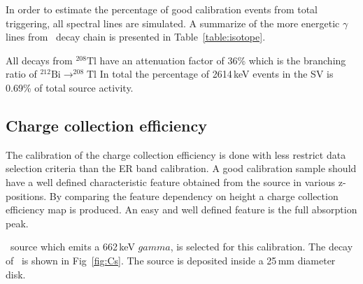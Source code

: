 In order to estimate the percentage of good calibration events from total triggering, all spectral lines are simulated.  
A summarize of the more energetic $\gamma$ lines from \Th\ decay chain is presented in Table~\ref{table:isotope}.
\begin{table}
\begin{center}
\caption{High energy gamma lines from \Th\ decay chain}
\label{table:isotope}
\end{center}
\end{table}

All decays from $^{208}\mathrm{Tl}$ have an attenuation factor of 36\% which is the branching ratio of $^{212}\mathrm{Bi} \rightarrow ^{208}\mathrm{Tl}$
In total the percentage of 2614\,keV events in the SV is 0.69\% of total source activity.

\subsection{Charge collection efficiency}
The calibration of the charge collection efficiency is done with less restrict data selection criteria than the ER band calibration. A good calibration sample  should have a well defined characteristic feature obtained from the source in various z-positions. By comparing the feature dependency on height a charge collection efficiency map is produced. An easy and well defined feature is the full absorption peak. 

\Cs\ source which emits a 662\,keV $gamma$, is selected for this calibration. The decay of \Cs\ is shown in Fig~\ref{fig:Cs}. The source is deposited inside a 25\,mm diameter disk. 


